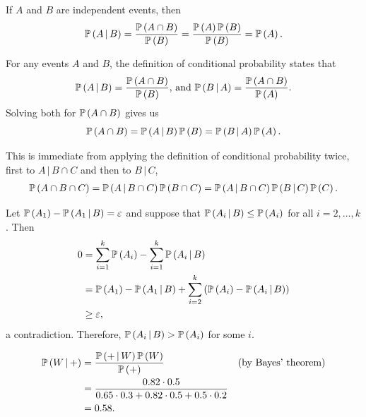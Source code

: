 \begin{ex}
  If $A$ and $B$ are independent events, then
  \[
    \cP{A}{B}=\frac{\P{A\cap B}}{\P{B}}=\frac{\P{A}\P{B}}{\P{B}}=\P{A}.
  \]

  For any events $A$ and $B$, the definition of conditional probability states
  that
  \[
    \cP{A}{B}=\frac{\P{A\cap B}}{\P{B}}\text{, and }
    \cP{B}{A}=\frac{\P{A\cap B}}{\P{A}}.
  \]
  Solving both for $\P{A\cap B}$ gives us
  \[
    \P{A\cap B}=\cP{A}{B}\P{B}=\cP{B}{A}\P{A}.
  \]
\end{ex}

\begin{ex}
  This is immediate from applying the definition of conditional probability
  twice, first to $A\,|\,B\cap C$ and then to $B\,|\,C$,
  \begin{align*}
    \P{A\cap B\cap C}
    =\cP{A}{B\cap C}\P{B\cap C}
    =\cP{A}{B\cap C}\cP{B}{C}\P{C}.
  \end{align*}
\end{ex}

\begin{ex}
  Let $\P{A_1}-\cP{A_1}{B}=\varepsilon$ and suppose that
  $\cP{A_i}{B}\leq \P{A_i}$ for all $i=2,\ldots,k$. Then
  \begin{align*}
    0 & = \sum_{i=1}^k\P{A_i}-\sum_{i=1}^k\cP{A_i}{B}                      \\
      & = \P{A_1}-\cP{A_1}{B}+\sum_{i=2}^k\left(\P{A_i}-\cP{A_i}{B}\right) \\
      & \geq \varepsilon,
  \end{align*}
  a contradiction. Therefore, $\cP{A_i}{B}> \P{A_i}$ for some $i$.
\end{ex}

\begin{ex}
  \begin{align*}
    \cP{W}{+}
     & =\frac{\cP{+}{W}\P{W}}{\P{+}}                                          &  & \text{(by Bayes' theorem)} \\
     & =\frac{0.82 \cdot 0.5}{0.65\cdot 0.3 + 0.82 \cdot 0.5 + 0.5 \cdot 0.2}                                 \\
     & =0.58.
  \end{align*}
\end{ex}

